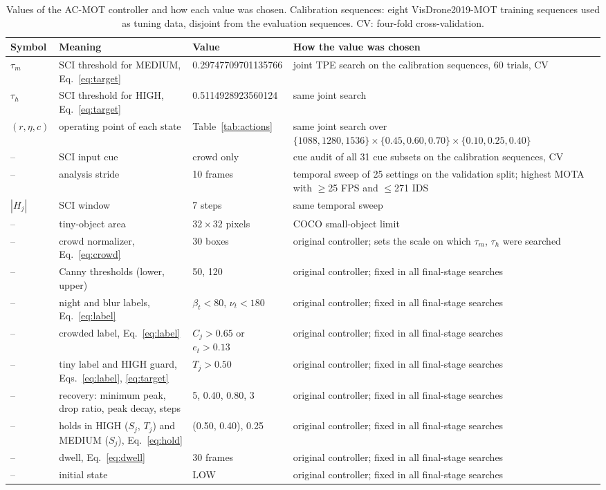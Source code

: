 \documentclass[pdflatex,sn-mathphys-num,iicol]{sn-jnl}
\begin{document}
\begin{table}[t]
\caption{Values of the AC-MOT controller and how each value was chosen.
Calibration sequences: eight VisDrone2019-MOT training sequences used as
tuning data, disjoint from the evaluation sequences. CV: four-fold
cross-validation.}
\label{tab:constants}
\centering\footnotesize
\setlength{\tabcolsep}{4pt}
\begin{tabular}{@{}l>{\raggedright\arraybackslash}p{50mm}l>{\raggedright\arraybackslash}p{62mm}@{}}
\toprule
Symbol & Meaning & Value & How the value was chosen\\
\midrule
$\tau_m$ & SCI threshold for MEDIUM, Eq.~\eqref{eq:target} & 0.29747709701135766 & joint TPE search on the calibration sequences, 60 trials, CV\\
$\tau_h$ & SCI threshold for HIGH, Eq.~\eqref{eq:target} & 0.5114928923560124 & same joint search\\
$(r,\eta,c)$ & operating point of each state & Table~\ref{tab:actions} & same joint search over $\{1088,1280,1536\}\times\{0.45,0.60,0.70\}\times\{0.10,0.25,0.40\}$\\
-- & SCI input cue & crowd only & cue audit of all 31 cue subsets on the calibration sequences, CV\\
-- & analysis stride & 10 frames & temporal sweep of 25 settings on the validation split; highest MOTA with $\geq$25 FPS and $\leq$271 IDS\\
$|H_j|$ & SCI window & 7 steps & same temporal sweep\\
-- & tiny-object area & $32\times32$ pixels & COCO small-object limit \cite{lin2014coco}\\
-- & crowd normalizer, Eq.~\eqref{eq:crowd} & 30 boxes & original controller; sets the scale on which $\tau_m$, $\tau_h$ were searched\\
-- & Canny thresholds (lower, upper) & 50, 120 & original controller; fixed in all final-stage searches\\
-- & night and blur labels, Eq.~\eqref{eq:label} & $\beta_t<80$, $\nu_t<180$ & original controller; fixed in all final-stage searches\\
-- & crowded label, Eq.~\eqref{eq:label} & $C_j>0.65$ or $e_t>0.13$ & original controller; fixed in all final-stage searches\\
-- & tiny label and HIGH guard, Eqs.~\eqref{eq:label}, \eqref{eq:target} & $T_j>0.50$ & original controller; fixed in all final-stage searches\\
-- & recovery: minimum peak, drop ratio, peak decay, steps & 5, 0.40, 0.80, 3 & original controller; fixed in all final-stage searches\\
-- & holds in HIGH ($S_j$, $T_j$) and MEDIUM ($S_j$), Eq.~\eqref{eq:hold} & (0.50, 0.40), 0.25 & original controller; fixed in all final-stage searches\\
-- & dwell, Eq.~\eqref{eq:dwell} & 30 frames & original controller; fixed in all final-stage searches\\
-- & initial state & LOW & original controller; fixed in all final-stage searches\\
\bottomrule
\end{tabular}
\end{table}
\end{document}
